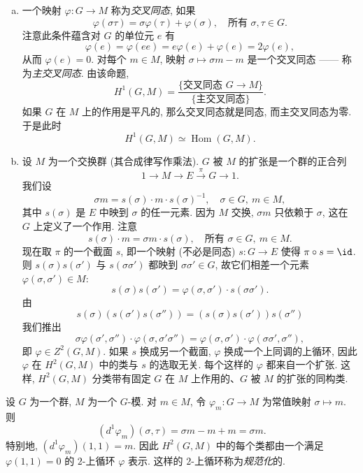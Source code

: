 \begin{example}\label{ex:ii.1.18}
\begin{enumerate}[(a)]
\item 一个映射 $\varphi\colon G\to M$ 称为\emph{交叉同态}, 如果
\[
 \varphi(\sigma\tau)=\sigma\varphi(\tau)+\varphi(\sigma),\quad\text{所有 }\sigma,\tau\in G.
\]
注意此条件蕴含对 $G$ 的单位元 $e$ 有
\[
 \varphi(e)=\varphi(ee)=e\varphi(e)+\varphi(e)=2\varphi(e),
\]
从而 $\varphi(e)=0$. 对每个 $m\in M$, 映射 $\sigma\mapsto \sigma m-m$ 是一个交叉同态 —— 称为\emph{主交叉同态}. 由该命题,
\[
 H^1(G,M)=\frac{\{\text{交叉同态 }G\to M\}}{\{\text{主交叉同态}\}}.
\]
如果 $G$ 在 $M$ 上的作用是平凡的, 那么交叉同态就是同态, 而主交叉同态为零. 于是此时
\begin{equation*}
 H^1(G,M)\simeq \operatorname{Hom}(G,M).
\tag{16}
\end{equation*}
\item 设 $M$ 为一个交换群 (其合成律写作乘法). $G$ 被 $M$ 的扩张是一个群的正合列
\[
 1\to M\to E\xrightarrow{\pi} G\to 1.
\]
我们设
\[
 \sigma m=s(\sigma)\cdot m\cdot s(\sigma)^{-1},\quad \sigma\in G,\ m\in M,
\]
其中 $s(\sigma)$ 是 $E$ 中映到 $\sigma$ 的任一元素. 因为 $M$ 交换, $\sigma m$ 只依赖于 $\sigma$, 这在 $G$ 上定义了一个作用. 注意
\[
 s(\sigma)\cdot m=\sigma m\cdot s(\sigma),\quad\text{所有 }\sigma\in G,\ m\in M.
\]
现在取 $\pi$ 的一个截面 $s$, 即一个映射 (不必是同态) $s\colon G\to E$ 使得 $\pi\circ s=\id$. 则 $s(\sigma)s(\sigma')$ 与 $s(\sigma\sigma')$ 都映到 $\sigma\sigma'\in G$, 故它们相差一个元素 $\varphi(\sigma,\sigma')\in M$:
\[
 s(\sigma)s(\sigma')=\varphi(\sigma,\sigma')\cdot s(\sigma\sigma').
\]
由
\[
 s(\sigma)(s(\sigma')s(\sigma''))=(s(\sigma)s(\sigma'))s(\sigma'')
\]
我们推出
\[
 \sigma\varphi(\sigma',\sigma'')\cdot\varphi(\sigma,\sigma'\sigma'')=\varphi(\sigma,\sigma')\cdot\varphi(\sigma\sigma',\sigma''),
\]
即 $\varphi\in Z^2(G,M)$. 如果 $s$ 换成另一个截面, $\varphi$ 换成一个上同调的上循环, 因此 $\varphi$ 在 $H^2(G,M)$ 中的类与 $s$ 的选取无关. 每个这样的 $\varphi$ 都来自一个扩张. 这样, $H^2(G,M)$ 分类带有固定 $G$ 在 $M$ 上作用的、$G$ 被 $M$ 的扩张的同构类.
\end{enumerate}
\end{example}

\begin{remark}\label{rem:ii.1.19}
设 $G$ 为一个群, $M$ 为一个 $G$-模. 对 $m\in M$, 令 $\varphi_m\colon G\to M$ 为常值映射 $\sigma\mapsto m$. 则
\[
 (d^1\varphi_m)(\sigma,\tau)=\sigma m-m+m=\sigma m.
\]
特别地, $(d^1\varphi_m)(1,1)=m$. 因此 $H^2(G,M)$ 中的每个类都由一个满足 $\varphi(1,1)=0$ 的 $2$-上循环 $\varphi$ 表示. 这样的 $2$-上循环称为\emph{规范化}的.
\end{remark}

